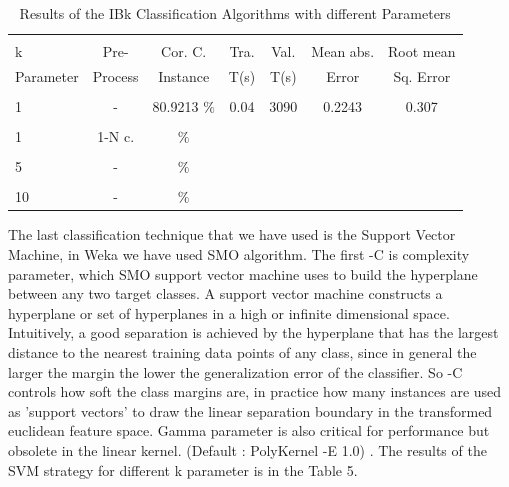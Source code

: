 \documentclass[a4paper]{article}
\begin{document}
\begin{table}
\begin{tabular}{|l| c | c | c | c |c |c |}

\hline & & & & & & \\
k &  Pre- & Cor. C. & Tra. & Val. & Mean abs.  & Root mean \\
Parameter& Process & Instance & T(s) &  T(s) & Error & Sq. Error \\
\hline & & & & & & \\
1 	 & - &			80.9213		   $\%$ &	0.04		& 	3090	 & 	0.2243	 & 0.307  \\ 
\hline & & & & & & \\	
1 	 & 1-N c.  &				   $\%$ &			& 		 & 		 &  \\ 
\hline & & & & & & \\
5	 & - &		  			 $\%$ &			& 		 & 		 &  \\ 
\hline & & & & & & \\	
10	 & - &		  			 $\%$ &			& 		 & 		 &  \\ 
\hline
\end{tabular}
\caption{Results of the IBk Classification Algorithms with different Parameters}
\end{table}

The last classification technique that we have used is the Support Vector
Machine, in Weka we have used SMO algorithm. The first -C is complexity
parameter, which SMO support vector machine uses to build the hyperplane
between any two target classes. A support vector machine constructs a
hyperplane or set of hyperplanes in a high or infinite dimensional space.
Intuitively, a good separation is achieved by the
hyperplane that has the largest distance to the nearest training data points of
any class, since in general the larger the margin the lower the generalization
error of the classifier. So -C controls how soft the class margins are, in
practice how many instances are used as 'support vectors' to draw the linear
separation boundary in the transformed euclidean feature space. Gamma parameter
is also critical for performance but obsolete in the linear kernel. (Default :
PolyKernel -E 1.0) . The results of the  SVM  strategy for different k
parameter is in the Table 5.
\end{document}
